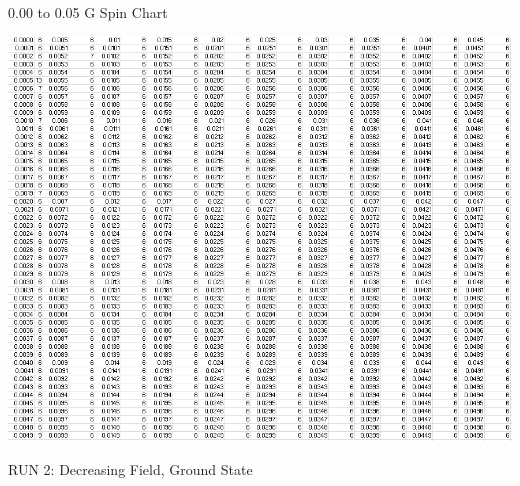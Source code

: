 \documentclass{article}
\begin{document}
\begin{center}
\LARGE 0.00 to 0.05 G Spin Chart

 \includegraphics[keepaspectratio,scale=0.7]{000to005SpinChart.png}
\end{center}
\pagebreak
\thispagestyle{plain}
\begin{center}
\LARGE
RUN 2: Decreasing Field, Ground State
\end{center}
\end{document}
